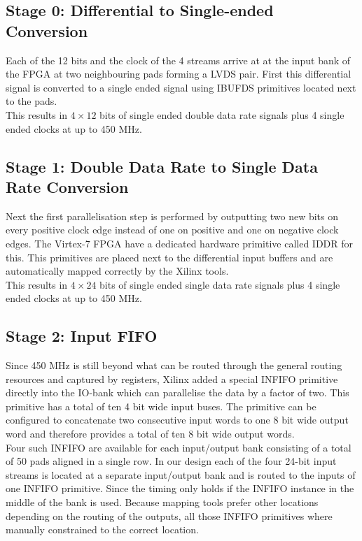 \subsection{Stage 0: Differential to Single-ended Conversion}
Each of the 12 bits and the clock of the 4 streams arrive at at the input bank
of the \gls{FPGA} at two neighbouring pads forming a \gls{LVDS} pair.
First this differential signal is converted to a single ended signal using
\gls{IBUFDS} primitives located next
to the pads. \\

This results in $4 \times 12$ bits of single ended double data rate
signals plus 4 single ended clocks at up to 450 MHz. \\

\subsection{Stage 1: Double Data Rate to Single Data Rate Conversion}
\label{sec:fpga_adc_s1}
Next the first parallelisation step is performed by outputting two new
bits on every positive clock edge instead of one on positive and one on negative
clock edges. The Virtex-7 \gls{FPGA} have a dedicated hardware primitive
called \gls{IDDR} for this.
This primitives are placed next to the differential input buffers
and are automatically mapped correctly by the Xilinx tools. \\

This results in $4 \times 24$ bits of single ended single data rate
signals plus 4 single ended clocks at up to 450 MHz. \\

\subsection{Stage 2: Input FIFO}
Since 450 MHz is still beyond what can be routed through the general
routing resources and captured by registers, Xilinx added a special
\gls{INFIFO} primitive directly into the IO-bank which can parallelise the data
by a factor of two.
This primitive has a total of ten 4 bit wide input buses.
The primitive can be configured to concatenate two consecutive input words
to one 8 bit wide output word and therefore provides a total of
ten 8 bit wide output words. \\

Four such \gls{INFIFO} are available for each
input/output bank consisting of a total of 50 pads aligned in a single row.
In our design each of the four 24-bit input streams is located at a separate
input/output bank and is routed to the inputs of one \gls{INFIFO} primitive.
Since the timing only holds if the \gls{INFIFO} instance in the middle of the bank
is used. Because mapping tools prefer other locations depending on the
routing of the outputs, all those \gls{INFIFO} primitives where manually constrained
to the correct location. \\

